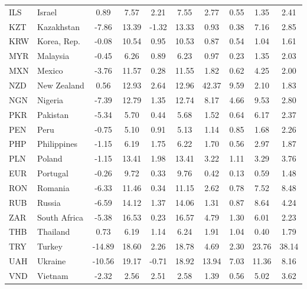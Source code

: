\documentclass{article}
\begin{document}
\begin{table}[htbp]
\begin{tabular}{llcccccccc}
    ILS   & Israel & 0.89  & 7.57  & 2.21  & 7.55  & 2.77  & 0.55  & 1.35  & 2.41 \\
    KZT   & Kazakhstan & -7.86 & 13.39 & -1.32 & 13.33 & 0.93  & 0.38  & 7.16  & 2.85 \\
    KRW   & Korea, Rep. & -0.08 & 10.54 & 0.95  & 10.53 & 0.87  & 0.54  & 1.04  & 1.61 \\
    MYR   & Malaysia & -0.45 & 6.26  & 0.89  & 6.23  & 0.97  & 0.23  & 1.35  & 2.03 \\
    MXN   & Mexico & -3.76 & 11.57 & 0.28  & 11.55 & 1.82  & 0.62  & 4.25  & 2.00 \\
    NZD   & New Zealand & 0.56  & 12.93 & 2.64  & 12.96 & 42.37 & 9.59  & 2.10  & 1.83 \\
    NGN   & Nigeria & -7.39 & 12.79 & 1.35  & 12.74 & 8.17  & 4.66  & 9.53  & 2.80 \\
    PKR   & Pakistan & -5.34 & 5.70  & 0.44  & 5.68  & 1.52  & 0.64  & 6.17  & 2.37 \\
    PEN   & Peru  & -0.75 & 5.10  & 0.91  & 5.13  & 1.14  & 0.85  & 1.68  & 2.26 \\
    PHP   & Philippines & -1.15 & 6.19  & 1.75  & 6.22  & 1.70  & 0.56  & 2.97  & 1.87 \\
    PLN   & Poland & -1.15 & 13.41 & 1.98  & 13.41 & 3.22  & 1.11  & 3.29  & 3.76 \\
    EUR   & Portugal & -0.26 & 9.72  & 0.33  & 9.76  & 0.42  & 0.13  & 0.59  & 1.48 \\
    RON   & Romania & -6.33 & 11.46 & 0.34  & 11.15 & 2.62  & 0.78  & 7.52  & 8.48 \\
    RUB   & Russia & -6.59 & 14.12 & 1.37  & 14.06 & 1.31  & 0.87  & 8.64  & 4.24 \\
    ZAR   & South Africa & -5.38 & 16.53 & 0.23  & 16.57 & 4.79  & 1.30  & 6.01  & 2.23 \\
    THB   & Thailand & 0.73  & 6.19  & 1.14  & 6.24  & 1.91  & 1.04  & 0.40  & 1.79 \\
    TRY   & Turkey & -14.89 & 18.60 & 2.26  & 18.78 & 4.69  & 2.30  & 23.76 & 38.14 \\
    UAH   & Ukraine & -10.56 & 19.17 & -0.71 & 18.92 & 13.94 & 7.03  & 11.36 & 8.16 \\
    VND   & Vietnam & -2.32 & 2.56  & 2.51  & 2.58  & 1.39  & 0.56  & 5.02  & 3.62 \\
    \bottomrule
    \end{tabular}%
  \label{tab:addlabel}%
\end{table}%
\end{document}
